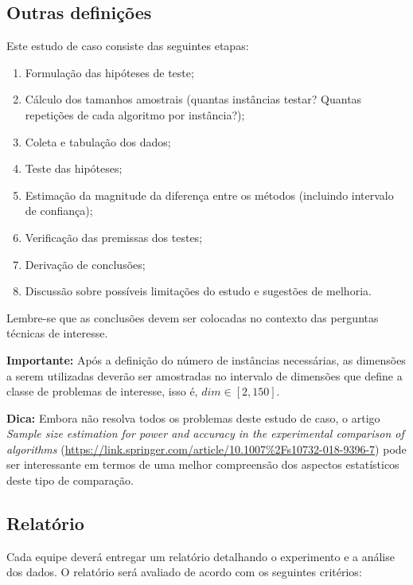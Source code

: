 \documentclass[11pt,twoside,printwatermark=false]{pinp}
\providecommand{\tightlist}{%
  \setlength{\itemsep}{0pt}\setlength{\parskip}{0pt}}
\begin{document}
\subsection{Outras definições}\label{outras-definicoes}

Este estudo de caso consiste das seguintes etapas:

\begin{enumerate}
\def\labelenumi{\arabic{enumi}.}
\tightlist
\item
  Formulação das hipóteses de teste;
\item
  Cálculo dos tamanhos amostrais (quantas instâncias testar? Quantas
  repetições de cada algoritmo por instância?);
\item
  Coleta e tabulação dos dados;
\item
  Teste das hipóteses;
\item
  Estimação da magnitude da diferença entre os métodos (incluindo
  intervalo de confiança);
\item
  Verificação das premissas dos testes;
\item
  Derivação de conclusões;
\item
  Discussão sobre possíveis limitações do estudo e sugestões de
  melhoria.
\end{enumerate}

Lembre-se que as conclusões devem ser colocadas no contexto das
perguntas técnicas de interesse.

\textbf{Importante:} Após a definição do número de instâncias
necessárias, as dimensões a serem utilizadas deverão ser amostradas no
intervalo de dimensões que define a classe de problemas de interesse,
isso é, \(dim\in\left[2,150\right]\).

\textbf{Dica:} Embora não resolva todos os problemas deste estudo de
caso, o artigo \emph{Sample size estimation for power and accuracy in
the experimental comparison of algorithms}
(\url{https://link.springer.com/article/10.1007\%2Fs10732-018-9396-7})
pode ser interessante em termos de uma melhor compreensão dos aspectos
estatísticos deste tipo de comparação.

\subsection{Relatório}\label{relatorio}

Cada equipe deverá entregar um relatório detalhando o experimento e a
análise dos dados. O relatório será avaliado de acordo com os seguintes
critérios:
\end{document}
